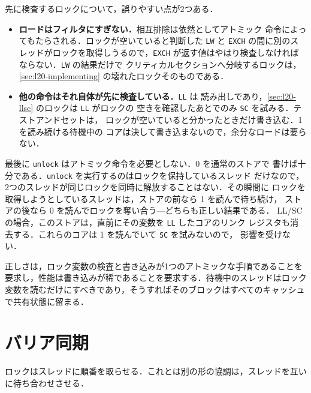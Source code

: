 \documentclass[../main.tex]{subfiles}
\begin{document}
先に検査するロックについて，誤りやすい点が2つある．
\begin{itemize}
  \item \textbf{ロードはフィルタにすぎない．}相互排除は依然としてアトミック
    命令によってもたらされる．ロックが空いていると判断した \texttt{LW} と
    \texttt{EXCH} の間に別のスレッドがロックを取得しうるので，\texttt{EXCH}
    が返す値はやはり検査しなければならない．\texttt{LW} の結果だけで
    クリティカルセクションへ分岐するロックは，\cref{sec:l20-implementing}
    の壊れたロックそのものである．
  \item \textbf{他の命令はそれ自体が先に検査している．}\texttt{LL} は
    読み出しであり，\cref{sec:l20-llsc} のロックは \texttt{LL} がロックの
    空きを確認したあとでのみ \texttt{SC} を試みる．テストアンドセットは，
    ロックが空いていると分かったときだけ書き込む．1 を読み続ける待機中の
    コアは決して書き込まないので，余分なロードは要らない．
\end{itemize}

最後に \texttt{unlock} はアトミック命令を必要としない．0 を通常のストアで
書けば十分である．\texttt{unlock} を実行するのはロックを保持しているスレッド
だけなので，2つのスレッドが同じロックを同時に解放することはない．その瞬間に
ロックを取得しようとしているスレッドは，ストアの前なら 1 を読んで待ち続け，
ストアの後なら 0 を読んでロックを奪い合う---どちらも正しい結果である．
LL/SC の場合，このストアは，直前にその変数を \texttt{LL} したコアのリンク
レジスタも消去する．これらのコアは 1 を読んでいて \texttt{SC} を試みないので，
影響を受けない．

\begin{keypoint}
  正しさは，ロック変数の検査と書き込みが1つのアトミックな手順であることを
  要求し，性能は書き込みが稀であることを要求する．待機中のスレッドはロック
  変数を読むだけにすべきであり，そうすればそのブロックはすべてのキャッシュ
  で共有状態に留まる．
\end{keypoint}

\section{バリア同期}
\label{sec:l20-barrier}

ロックはスレッドに順番を取らせる．これとは別の形の協調は，スレッドを互いに待ち合わせさせる．
\end{document}
